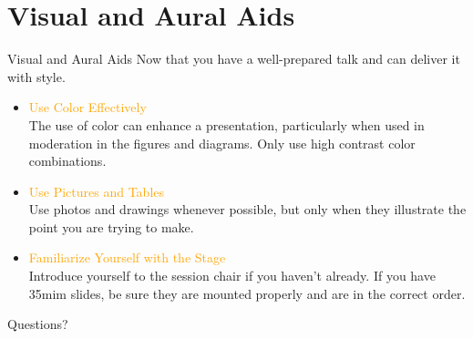 \documentclass[
 size=14pt,
 paper=smartboard,  %
 mode=present, 		%
 display=slides, 	%
 style=tuliplab,  	%
 pauseslide,
 fleqn,leqno]{powerdot}
\begin{document}
\section{Visual and Aural Aids}
\begin{slide}[toc=,bm=]{Visual and Aural Aids}
Now that you have a well-prepared talk and can deliver it with style.
\begin{itemize}
  \item \textcolor{orange}{Use Color Effectively}\\
  The use of color can enhance a presentation,
  particularly when used in moderation in the
  figures and diagrams.
  Only use high contrast color combinations.

  \item \textcolor{orange}{Use Pictures and Tables}\\
  Use photos and drawings whenever possible,
  but only when they illustrate the point
  you are trying to make.

  \item \textcolor{orange}{Familiarize Yourself with the Stage} \\
  Introduce yourself to the session chair if you haven't already.
  If you have 35mim slides,
  be sure they are mounted properly and are in the correct order.
\end{itemize}
\end{slide}
%
\begin{slide}[toc=,bm=]{Questions?}
\begin{center}
\begin{figure}
\end{figure}
\end{center}
\end{slide}
\end{document}
